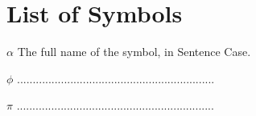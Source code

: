 \chapter*{List of Symbols}

\begin{leftitemize}
    \item[$\alpha$] The full name of the symbol, in Sentence Case.
    \item[$\phi$] ...............................................................
    \item[$\pi$] ...............................................................
\end{leftitemize}
